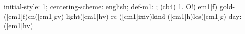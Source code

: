initial-style: 1;
centering-scheme: english;
def-m1: \grealign;
(cb4) 1. O!([em1]f) gold-([em1]f)en([em1]gv) light([em1]hv) re-([em1]ixiv)kind-([em1]h)les([em1]g) day:([em1]hv)